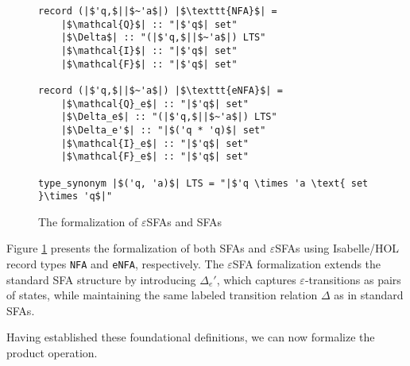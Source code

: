\documentclass[sigplan,10pt,anonymous,review]{acmart}\settopmatter{printfolios=true,printccs=false,printacmref=false}
\begin{document}
\begin{figure}[hbt!]
	\begin{lstlisting}
record (|$'q,$||$~'a$|) |$\texttt{NFA}$| =
	|$\mathcal{Q}$| :: "|$'q$| set"
	|$\Delta$| :: "(|$'q,$||$~'a$|) LTS"
	|$\mathcal{I}$| :: "|$'q$| set"
	|$\mathcal{F}$| :: "|$'q$| set"

record (|$'q,$||$~'a$|) |$\texttt{eNFA}$| =
	|$\mathcal{Q}_e$| :: "|$'q$| set"
	|$\Delta_e$| :: "(|$'q,$||$~'a$|) LTS"
	|$\Delta_e'$| :: "|$('q * 'q)$| set"
	|$\mathcal{I}_e$| :: "|$'q$| set"
	|$\mathcal{F}_e$| :: "|$'q$| set"

type_synonym |$('q, 'a)$| LTS = "|$'q \times 'a \text{ set }\times 'q$|"    
	\end{lstlisting}
\caption{The formalization of $\varepsilon$SFAs and SFAs}
\label{fig-def-FAs}
\end{figure}

Figure \ref{fig-def-FAs} presents the formalization of both SFAs and $\varepsilon$SFAs using Isabelle/HOL record types \texttt{NFA} and \texttt{eNFA}, respectively. The $\varepsilon$SFA formalization extends the standard SFA structure by introducing $\Delta_e'$, which captures $\varepsilon$-transitions as pairs of states, while maintaining the same labeled transition relation $\Delta$ as in standard SFAs.

Having established these foundational definitions, we can now formalize the product operation. 
\end{document}

